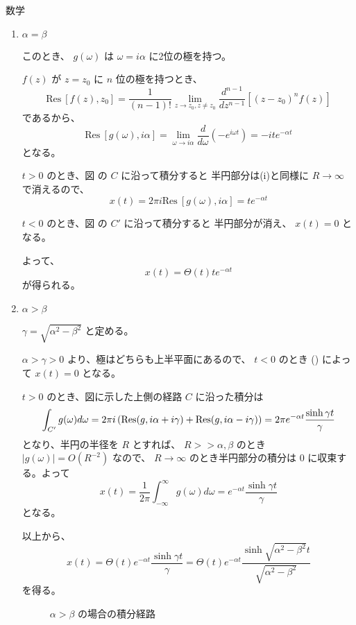 \documentclass[fleqn]{jbook}
\begin{document}
\begin{answer}{数学}{}
\begin{enumerate}
\begin{enumerate}
\begin{enumerate}
以上から、
\[
x(t) = \Theta(t) e^{-\alpha t}\frac{\sin \gamma t}{\gamma}
= \Theta(t) e^{-\alpha t}\frac{\sin \sqrt{\beta^2-\alpha^2} t}{\sqrt{\beta^2-\alpha^2}}
\]
を得る。
\begin{figure}[h]
\begin{center}

\end{center}
\caption{$\alpha<\beta$ の場合の積分経路}
\end{figure}
\newpage
\item $\alpha=\beta$

このとき、 $g(\omega)$ は $\omega=i\alpha$ に2位の極を持つ。

$f(z)$ が $z=z_0$ に $n$ 位の極を持つとき、
\[
 \mbox{Res}~[f(z),z_0] = \frac{1}{(n-1)!}
\lim_{z\rightarrow z_0,z\neq z_0}\frac{d^{n-1}}{dz^{n-1}}
\left[(z-z_0)^n f(z)\right]
\]
であるから、
\[
\mbox{Res}~[g(\omega),i\alpha]
= \lim_{\omega\rightarrow i\alpha}\frac{d}{d\omega}(-e^{i\omega t})
= -ite^{-\alpha t}
\]
となる。

$t>0$ のとき、図 の $C$ に沿って積分すると
半円部分は(i)と同様に $R\rightarrow\infty$ で消えるので、
\[
 x(t) = 2\pi i\mbox{Res}~[g(\omega),i\alpha] = te^{-\alpha t}
\]

$t<0$ のとき、図 の $C'$ に沿って積分すると
半円部分が消え、 $x(t)=0$ となる。

よって、
\[
 x(t) = \Theta(t)te^{-\alpha t}
\]
が得られる。
\newpage
\item $\alpha>\beta$

$\gamma = \sqrt{\alpha^2-\beta^2}$ と定める。

$\alpha>\gamma>0$ より、極はどちらも上半平面にあるので、
$t<0$ のとき () によって $x(t)=0$ となる。

$t>0$ のとき、図に示した上側の経路 $C$ に沿った積分は
\[
\int_{C'}g(\omega)d\omega
= 2\pi i \left({\rm Res}(g,i\alpha+i\gamma)+{\rm Res}(g,i\alpha-i\gamma)\right)
= 2\pi e^{-\alpha t}\frac{\sinh \gamma t}{\gamma}
\]
となり、半円の半径を $R$ とすれば、 $R>>\alpha,\beta$ のとき $|g(\omega)|=O(R^{-2})$ なので、
$R\rightarrow\infty$ のとき半円部分の積分は $0$ に収束する。よって
\[
x(t) = \frac1{2\pi}\int_{-\infty}^\infty g(\omega)d\omega = e^{-\alpha t}\frac{\sinh \gamma t}{\gamma}
\]
となる。

以上から、
\[
x(t) = \Theta(t) e^{-\alpha t}\frac{\sinh \gamma t}{\gamma}
= \Theta(t) e^{-\alpha t}\frac{\sinh \sqrt{\alpha^2-\beta^2} t}{\sqrt{\alpha^2-\beta^2}}
\]
を得る。
\begin{figure}[h]
\begin{center}

\end{center}
\caption{$\alpha>\beta$ の場合の積分経路}
\end{figure}


\end{enumerate}
\end{enumerate}
\end{enumerate}
\end{answer}
\end{document}
